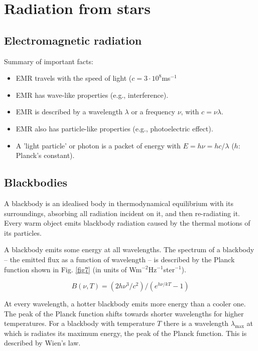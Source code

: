 \section{Radiation from stars}

\subsection{Electromagnetic radiation}

Summary of important facts:
\begin{itemize}
\item{EMR travels with the speed of light ($c = 3\cdot10^8$ms$^{-1}$}
\item{EMR has wave-like properties (e.g., interference).}
\item{EMR is described by a wavelength $\lambda$ or a frequency $\nu$,
with $c = \nu\lambda$.}
\item{EMR also has particle-like properties (e.g., photoelectric effect).}
\item{A 'light particle' or photon is a packet of energy with $E = h \nu = h c / \lambda$ ($h$: Planck's constant).}
\end{itemize}

\subsection{Blackbodies}

A blackbody is an idealised body in thermodynamical equilibrium with its surroundings, absorbing all radiation incident on it, and then re-radiating it. Every warm object emits blackbody radiation caused by the thermal motions of its particles.

A blackbody emits some energy at all wavelengths. The spectrum of a blackbody -- the emitted flux as a function of wavelength -- is described by the Planck function shown in Fig. \ref{fig7} (in units of Wm$^{-2}$Hz$^{-1}$ster$^{-1}$).

\begin{equation}
B(\nu,T) = (2h\nu^3/c^2) / (e^{h\nu/kT} - 1)
\label{eq15}
\end{equation}

At every wavelength, a hotter blackbody emits more energy than a cooler one. The peak of the Planck function shifts towards shorter wavelengths for higher temperatures. For a blackbody with temperature $T$ there is a wavelength $\lambda_{\mathrm{max}}$ at which is radiates its maximum energy, the peak of the Planck function. This is described by Wien's law. 

